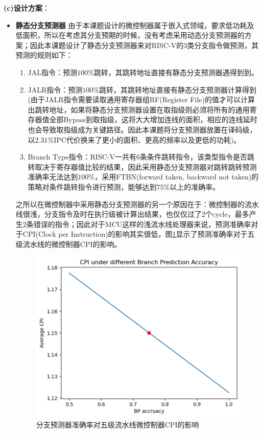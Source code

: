 \documentclass[a4paper, 12pt]{article}
\begin{document}
\textbf{(c)设计方案}：
  \begin{itemize}
    \item \textbf{静态分支预测器}
      由于本课题设计的微控制器属于嵌入式领域，要求低功耗及低面积，所以在考虑其分支预期的时候，没有考虑采用动态分支预测器的方案；因此本课题设计了静态分支预测器来对RISC-V的3类分支指令做预测，其预测的规则如下：
      \begin{enumerate}
        \item JAL指令：预测$100\%$跳转，其跳转地址直接有静态分支预测器遇得到到。
        \item JALR指令：预测$100\%$跳转，其跳转地址直接有静态分支预测器计算得到(由于JALR指令需要读取通用寄存器组RF(Register File)的值才可以计算出跳转地址，如果将静态分支预测器设置在取指级则必须将所有的通用寄存器值全部Bypass到取指级，这将大大增加连线的面积，相应的连线延时也会导致取指级成为关键路径。因此本课题将分支预测器放置在译码级，以$2.31\%$IPC代价换来了更小的面积、更高的频率以及更低的功耗)。
        \item Branch Type指令：RISC-V一共有6条条件跳转指令，该类型指令是否跳转取决于寄存器值比较的结果，因此采用静态分支预测器对跳转跳转预测准确率无法达到$100\%$，采用FTBN(forward taken, backward not taken)的策略对条件跳转指令进行预测，能够达到$75\%$以上的准确率。
      \end{enumerate}
      之所以在微控制器中采用静态分支预测器的另一个原因在于：微控制器的流水线很浅，分支指令及时在执行级被计算出结果，也仅仅过了2个cycle，最多产生2条错误的指令；因此对于MCU这样的浅流水线处理器来说，预测准确率对于CPI(Clock per Instruction)的影响其实很低，图\ref{fig:sbp_cpi}显示了预测准确率对于五级流水线的微控制器CPI的影响。
    \begin{figure}[htbp]
      \centering
      \includegraphics[width=0.7\linewidth]{./images/sbp_cpi.png}
      \caption{分支预测器准确率对五级流水线微控制器CPI的影响}
      \label{fig:sbp_cpi}
    \end{figure}


\end{itemize}
\end{document}
